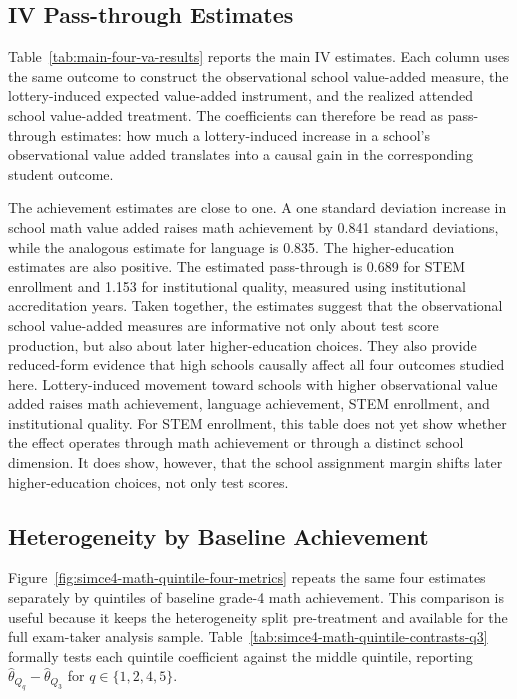 \documentclass[a4paper, article, english, oneside, unknownkeysallowed, 12pt]{memoir}
\begin{document}
\subsection{IV Pass-through Estimates}


Table~\ref{tab:main-four-va-results} reports the main IV estimates.
Each column uses the same outcome to construct the observational school value-added measure, the lottery-induced expected value-added instrument, and the realized attended school value-added treatment.
The coefficients can therefore be read as pass-through estimates: how much a lottery-induced increase in a school's observational value added translates into a causal gain in the corresponding student outcome.

The achievement estimates are close to one.
A one standard deviation increase in school math value added raises math achievement by 0.841 standard deviations, while the analogous estimate for language is 0.835.
The higher-education estimates are also positive.
The estimated pass-through is 0.689 for STEM enrollment and 1.153 for institutional quality, measured using institutional accreditation years.
Taken together, the estimates suggest that the observational school value-added measures are informative not only about test score production, but also about later higher-education choices.
They also provide reduced-form evidence that high schools causally affect all four outcomes studied here.
Lottery-induced movement toward schools with higher observational value added raises math achievement, language achievement, STEM enrollment, and institutional quality.
For STEM enrollment, this table does not yet show whether the effect operates through math achievement or through a distinct school dimension.
It does show, however, that the school assignment margin shifts later higher-education choices, not only test scores.




\subsection{Heterogeneity by Baseline Achievement}

Figure~\ref{fig:simce4-math-quintile-four-metrics} repeats the same four estimates separately by quintiles of baseline grade-4 math achievement.
This comparison is useful because it keeps the heterogeneity split pre-treatment and available for the full exam-taker analysis sample.
Table~\ref{tab:simce4-math-quintile-contrasts-q3} formally tests each quintile coefficient against the middle quintile, reporting $\widehat{\theta}_{Q_q}-\widehat{\theta}_{Q_3}$ for $q\in\{1,2,4,5\}$.
\end{document}
